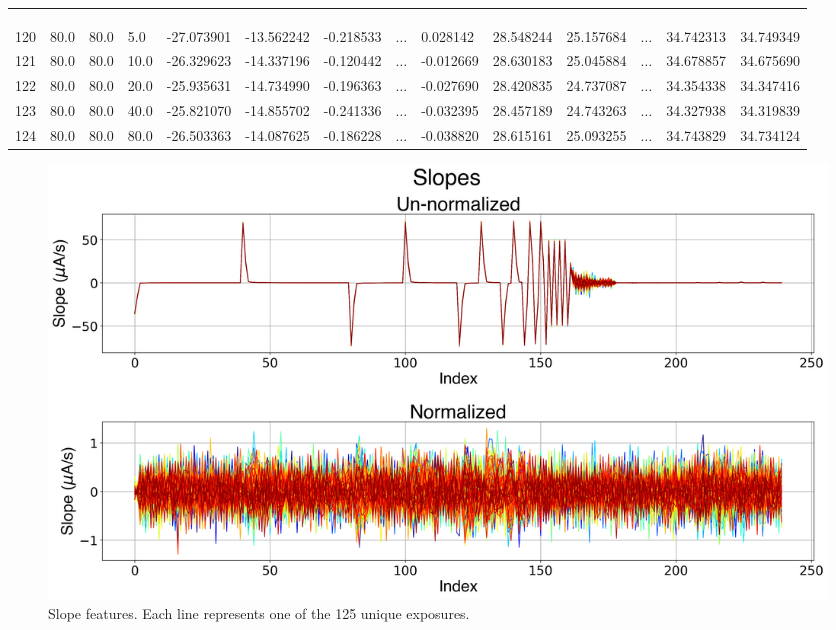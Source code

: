 \begin{table}
{\begin{tabular}{cp{0.3cm}p{0.8cm}p{0.8cm}p{1.8cm}p{1.8cm}p{1.8cm}p{0.3cm}p{1.8cm}p{1.8cm}p{1.8cm}p{0.3cm}p{1.6cm}p{1.6cm}}
	\bottomrule
	&&&&&&&&&&&&&\\
	&&&&&&&&\sbox0{\dots}\makebox[\wd0]{\vdots}&&&&&\\
	&&&&&&&&&&&&&\\
	\toprule
	
	 120&80.0 &  80.0 &   5.0 &      -27.073901 &      -13.562242 &       -0.218533 &$\dots$&             0.028142 &     28.548244 &     25.157684 &$\dots$&          34.742313 &         34.749349 \\
	121&80.0 &  80.0 &  10.0 &      -26.329623 &      -14.337196 &       -0.120442 &$\dots$&            -0.012669 &     28.630183 &     25.045884 &$\dots$&          34.678857 &         34.675690 \\
	122&80.0 &  80.0 &  20.0 &      -25.935631 &      -14.734990 &       -0.196363 &$\dots$&            -0.027690 &     28.420835 &     24.737087 &$\dots$&          34.354338 &         34.347416 \\
	123&80.0 &  80.0 &  40.0 &      -25.821070 &      -14.855702 &       -0.241336 &$\dots$&            -0.032395 &     28.457189 &     24.743263 &$\dots$&          34.327938 &         34.319839 \\
	124&80.0 &  80.0 &  80.0 &      -26.503363 &      -14.087625 &       -0.186228 &$\dots$&            -0.038820 &     28.615161 &     25.093255 &$\dots$&          34.743829 &         34.734124 \\
	
	\bottomrule[0.5mm]
\end{tabular}}
\end{table}

\begin{figure}[h]
	\centering
	\includegraphics[width=1\textwidth]{../figures/slopes.png}
	\caption{Slope features. Each line represents one of the 125 unique exposures. }
	\label{fig:slopes}
\end{figure}

